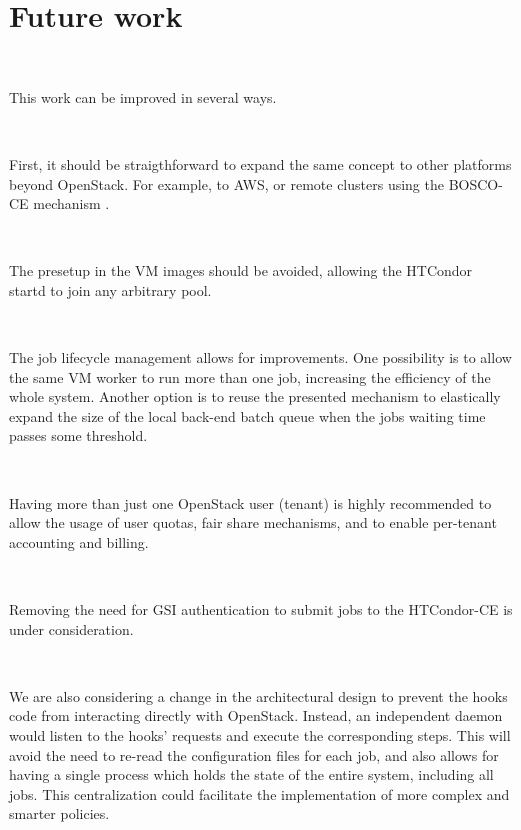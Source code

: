 \documentclass[a4paper]{jpconf}
\begin{document}

\section{Future work}

~

This work can be improved in several ways. 

~

First, it should be straigthforward to expand the same concept to other
platforms beyond OpenStack. For example, to AWS, 
or remote clusters using the BOSCO-CE mechanism \cite{boscoce}.

~

The presetup in the VM images should be avoided, allowing the HTCondor startd to join any arbitrary pool.

~

The job lifecycle management allows for improvements. 
One possibility is to allow the same VM worker to run more than one job,
increasing the efficiency of the whole system. Another option is to reuse the
presented mechanism to elastically expand the size of the local back-end batch
queue when the jobs waiting time passes some threshold.

~

Having more than just one OpenStack user (tenant) is highly recommended to allow
the usage of user quotas, fair share mechanisms, and to enable per-tenant
accounting and billing.

~

Removing the need for GSI authentication to submit jobs to the HTCondor-CE is under consideration.

~

We are also considering a change in the architectural design to prevent the
hooks code from interacting directly with OpenStack. Instead, an independent
daemon would listen to the hooks' requests and execute the corresponding steps.
This will avoid the need to re-read the configuration files for each job, 
and also allows for having a single process which holds the state of the entire
system, including all jobs. This centralization could facilitate the
implementation of more complex and smarter policies.
 
\end{document}

